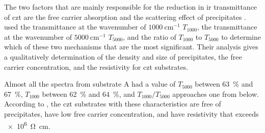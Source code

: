 The two factors that are mainly responsible for the reduction in \ac{ir} transmittance of \ac{czt} are the free carrier absorption and the scattering effect of precipitates \citep{yadava1994precipitation}. \citet{yujie2004infrared} used the transmittance at the wavenumber of $\SI{1000}{\centi\metre^{-1}}$ $T_{1000}$, the transmittance at the wavenumber of $\SI{5000}{\centi\metre^{-1}}$ $T_{5000}$, and the ratio of $T_{1000}$ to $T_{5000}$ to determine which of these two mechanisms that are the most significant. Their analysis gives a qualitatively determination of the density and size of  precipitates, the free carrier concentration, and the resistivity for \ac{czt} substrates. %

Almost all the spectra from substrate A had a value of $T_{5000}$ between \SI{63}{\percent} and \SI{67}{\percent}, $T_{1000}$ between \SI{62}{\percent} and \SI{64}{\percent}, and $T_{1000}/T_{5000}$ approaches one from below. According to \citet{yujie2004infrared}, the \ac{czt} substrates with these characteristics are free of precipitates, have low free carrier concentration, and have resistivity that exceeds \SI{e6}{\ohm\centi\metre}.
